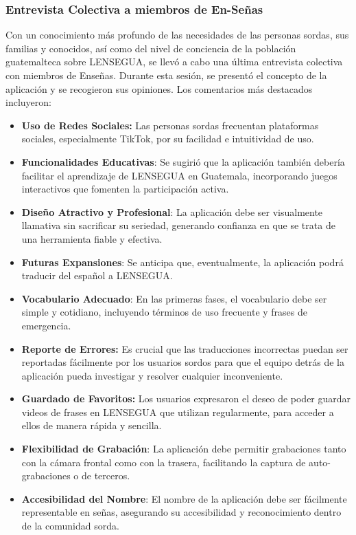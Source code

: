 \subsubsection{Entrevista Colectiva a miembros de En-Señas}

Con un conocimiento más profundo de las necesidades de las personas sordas, sus familias y conocidos, así como del nivel de conciencia de la población guatemalteca sobre LENSEGUA, se llevó a cabo una última entrevista colectiva con miembros de Enseñas. Durante esta sesión, se presentó el concepto de la aplicación y se recogieron sus opiniones. Los comentarios más destacados incluyeron:

\begin{itemize}
    \item \textbf{Uso de Redes Sociales:} Las personas sordas frecuentan plataformas sociales, especialmente TikTok, por su facilidad e intuitividad de uso.
    
    \item \textbf{Funcionalidades Educativas}: Se sugirió que la aplicación también debería facilitar el aprendizaje de LENSEGUA en Guatemala, incorporando juegos interactivos que fomenten la participación activa.
    
    \item \textbf{Diseño Atractivo y Profesional}: La aplicación debe ser visualmente llamativa sin sacrificar su seriedad, generando confianza en que se trata de una herramienta fiable y efectiva.
    
    \item \textbf{Futuras Expansiones}: Se anticipa que, eventualmente, la aplicación podrá traducir del español a LENSEGUA.
    
    \item \textbf{Vocabulario Adecuado}: En las primeras fases, el vocabulario debe ser simple y cotidiano, incluyendo términos de uso frecuente y frases de emergencia.
    
    \item \textbf{Reporte de Errores:} Es crucial que las traducciones incorrectas puedan ser reportadas fácilmente por los usuarios sordos para que el equipo detrás de la aplicación pueda investigar y resolver cualquier inconveniente.
    
    \item \textbf{Guardado de Favoritos:} Los usuarios expresaron el deseo de poder guardar videos de frases en LENSEGUA que utilizan regularmente, para acceder a ellos de manera rápida y sencilla.
    
    \item \textbf{Flexibilidad de Grabación}: La aplicación debe permitir grabaciones tanto con la cámara frontal como con la trasera, facilitando la captura de auto-grabaciones o de terceros.
    
    \item \textbf{Accesibilidad del Nombre}: El nombre de la aplicación debe ser fácilmente representable en señas, asegurando su accesibilidad y reconocimiento dentro de la comunidad sorda.
    
\end{itemize}

